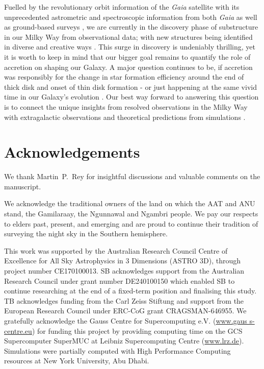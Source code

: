 \documentclass[fleqn,usenatbib]{mnras}
\begin{document}
Fuelled by the revolutionary orbit information of the \textit{Gaia} satellite \citep{Brown2016, Brown2018, Brown2021, Vallenari2023} with its unprecedented astrometric \citep{Lindegren2016, Lindegren2018, Lindegren2021a} and spectroscopic information from both \textit{Gaia} \citep{Katz2019, Katz2022} as well as ground-based surveys \citep[e.g.][]{SDSSDR17, Buder2021, Zhao2012, Conroy2019}, we are currently in the discovery phase of substructure in our Milky Way from observational data; with new structures being identified in diverse and creative ways \citep[e.g.][]{Naidu2021, Malhan2024}. This surge in discovery is undeniably thrilling, yet it is worth to keep in mind that our bigger goal remains to quantify the role of accretion on shaping our Galaxy. A major question continues to be, if accretion was responsibly for the change in star formation efficiency around the end of thick disk and onset of thin disk formation \citep{Conroy2022} - or just happening at the same vivid time in our Galaxy's evolution \citep[see the reviews by][for more extensive discussions]{Helmi2020, Deason2024}. Our best way forward to answering this question is to connect the unique insights from resolved observations in the Milky Way with extragalactic observations and theoretical predictions from simulations \citep[see e.g.][]{GECKOS2023}.

\section*{Acknowledgements}

We thank Martin~P.~Rey for insightful discussions and valuable comments on the manuscript.

We acknowledge the traditional owners of the land on which the AAT and ANU stand, the Gamilaraay, the Ngunnawal and Ngambri people. We pay our respects to elders past, present, and emerging and are proud to continue their tradition of surveying the night sky in the Southern hemisphere.

This work was supported by the Australian Research Council Centre of Excellence for All Sky Astrophysics in 3 Dimensions (ASTRO 3D), through project number CE170100013. SB acknowledges support from the Australian Research Council under grant number DE240100150 which enabled SB to continue researching at the end of a fixed-term position and finalising this study. TB acknowledges funding from the Carl Zeiss Stiftung and support from the European Research Council under ERC-CoG grant CRAGSMAN-646955. We gratefully acknowledge the Gauss Centre for Supercomputing e.V. (\url{www.gaus s-centre.eu}) for funding this project by providing computing time on the GCS Supercomputer SuperMUC at Leibniz Supercomputing Centre (\url{www.lrz.de}). Simulations were partially computed with High Performance Computing resources at New York University, Abu Dhabi.
\end{document}
